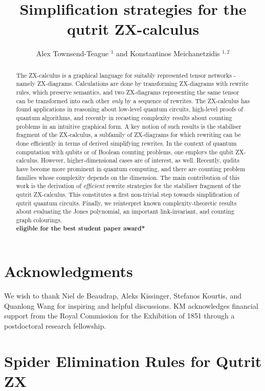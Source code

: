 \documentclass[submission]{eptcs}
\title{Simplification strategies for the qutrit ZX-calculus
}
\author{  Alex Townsend-Teague $^{1}$ and Konstantinos Meichanetzidis $^{1,2}$

\institute{$^1$ University of Oxford\\
$^2$ Cambridge Quantum Computing Ltd.} }
\begin{document}
\maketitle
\begin{abstract}
The ZX-calculus is a graphical language for suitably represented tensor networks - namely ZX-diagrams.
Calculations are done by transforming ZX-diagrams with rewrite rules, which preserve semantics, and two ZX-diagrams representing the same tensor can be transformed into each other \emph{only} by a sequence of rewrites.
The ZX-calculus has found applications in reasoning about low-level quantum circuits, high-level proofs of quantum algorithms, and recently in recasting complexity results about counting problems in an intuitive graphical form.
A key notion of such results is the stabiliser fragment of the ZX-calculus, a subfamily of ZX-diagrams for which rewriting can be done efficiently in terms of derived simplifying rewrites.
In the context of quantum computation with qubits or of Boolean counting problems, one employs the qubit ZX-calculus.
However, higher-dimensional cases are of interest, as well. Recently, qudits have become more prominent in quantum computing, and there are counting problem families whose complexity depends on the dimension.
The main contribution of this work is the derivation of
\emph{efficient} rewrite strategies for the stabiliser fragment of the qutrit ZX-calculus.
This constitutes a first non-trivial step towards simplification of qutrit quantum circuits. Finally, we reinterpret known complexity-theoretic results about evaluating the Jones polynomial, an important link-invariant, and counting graph colourings.\\
{\bf *eligible for the best student paper award*}
\end{abstract}







\section{Acknowledgments}
We wish to thank Niel de Beaudrap, Aleks Kissinger, Stefanos 
Kourtis, and Quanlong Wang for inspiring and helpful discussions.
KM acknowledges financial support from the Royal Commission for the Exhibition of 1851 through a postdoctoral research fellowship.

% 



\appendix



\section{Spider Elimination Rules for Qutrit ZX}




\end{document}
